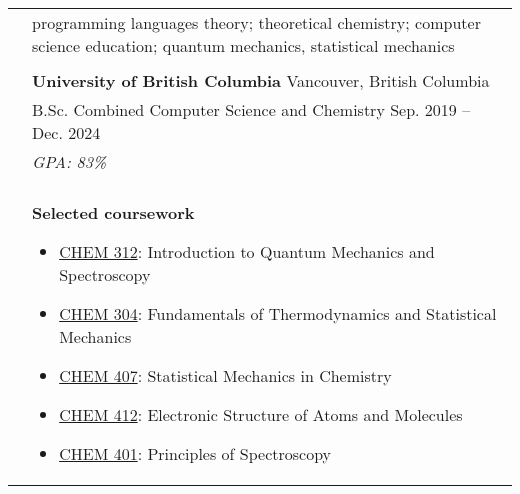 \documentclass[letterpaper, 11pt]{article}
\begin{document}

\vspace{0.5cm} 


\setlength{\tabcolsep}{8pt}

\begin{longtable}{p{1.3in}p{4.8in}}

\nohyphens{\color{Blue}{Research Interests}}
& programming languages theory; theoretical chemistry; computer science education; quantum mechanics, statistical mechanics \\
& \\

\color{Blue}{Education} 
& \textbf{University of British Columbia} \hfill Vancouver, British Columbia \\
& B.Sc. Combined Computer Science and Chemistry \hfill Sep. 2019 -- Dec. 2024 \\
& {\it GPA: 83\%} \\
& \\

& \textbf{Selected coursework}
\begin{itemize}[noitemsep,leftmargin=*]
\item \underline{CHEM 312}: Introduction to Quantum Mechanics and Spectroscopy
\item \underline{CHEM 304}: Fundamentals of Thermodynamics and Statistical Mechanics
\item \underline{CHEM 407}: Statistical Mechanics in Chemistry
\item \underline{CHEM 412}: Electronic Structure of Atoms and Molecules
\item \underline{CHEM 401}: Principles of Spectroscopy
\end{itemize} \\



\end{longtable}
\end{document}
